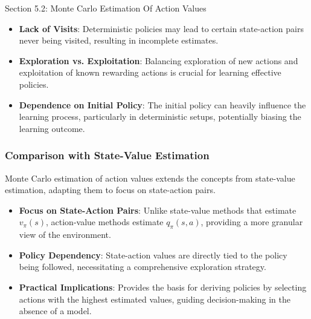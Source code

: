 \begin{notes}{Section 5.2: Monte Carlo Estimation Of Action Values}
\begin{highlight}
        \begin{itemize}
            \item \textbf{Lack of Visits}: Deterministic policies may lead to certain state-action pairs never being visited, resulting in incomplete estimates.
            \item \textbf{Exploration vs. Exploitation}: Balancing exploration of new actions and exploitation of known rewarding actions is crucial for learning effective policies.
            \item \textbf{Dependence on Initial Policy}: The initial policy can heavily influence the learning process, particularly in deterministic setups, potentially biasing the learning outcome.
        \end{itemize}
    
    \end{highlight}
    
    \subsubsection*{Comparison with State-Value Estimation}
    
    Monte Carlo estimation of action values extends the concepts from state-value estimation, adapting them to focus on state-action pairs.
    
    \begin{highlight}
    
        \begin{itemize}
            \item \textbf{Focus on State-Action Pairs}: Unlike state-value methods that estimate $v_\pi(s)$, action-value methods estimate $q_\pi(s, a)$, providing a more granular view of the environment.
            \item \textbf{Policy Dependency}: State-action values are directly tied to the policy being followed, necessitating a comprehensive exploration strategy.
            \item \textbf{Practical Implications}: Provides the basis for deriving policies by selecting actions with the highest estimated values, guiding decision-making in the absence of a model.
        \end{itemize}
    
    \end{highlight}
    
    \begin{highlight}
    

\end{highlight}
\end{notes}
